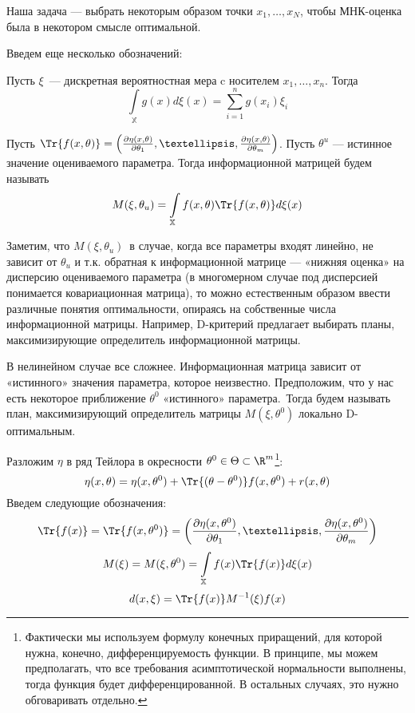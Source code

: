 Наша задача — выбрать некоторым образом точки $x_1, …, x_N$, чтобы МНК-оценка была в некотором смысле оптимальной. 

Введем еще несколько обозначений:
\begin{dfn}
Пусть $\xi$ — дискретная вероятностная мера c носителем $x_1,…, x_n$. Тогда
$$ \int\limits_{\mathbb{X}} g(x) d\xi(x) = \sum \limits_{i=1}^{n}  g(x_i)\xi_i$$
\end{dfn}

\begin{dfn}
Пусть $\Tr{f(x,\theta)} = \left(\frac{\partial\eta(x,\theta)}{\partial \theta_1}, …, \frac{\partial\eta(x,\theta)}{\partial \theta_m}\right)$. 
Пусть $\theta^u$ — истинное значение оцениваемого параметра. Тогда информационной матрицей будем называть
$$M(\xi, \theta_u) = \int\limits_{\mathbb{X}} f(x, \theta)\Tr{f(x, \theta)}d\xi(x)$$
\end{dfn}


Заметим, что $M(\xi, \theta_u)$ в случае, когда все параметры входят линейно, не зависит от $\theta_u$ и  т.к. обратная к информационной матрице — «нижняя оценка» на дисперсию оцениваемого параметра (в многомерном случае под дисперсией  понимается ковариационная матрица), то можно естественным образом ввести различные понятия оптимальности, опираясь на собственные числа информационной матрицы. Например, D-критерий предлагает выбирать планы, максимизирующие определитель информационной матрицы. 

В нелинейном случае все сложнее. Информационная матрица зависит от «истинного» значения параметра, которое неизвестно. Предположим, что у нас есть некоторое приближение $\theta^0$ «истинного» параметра. Тогда будем называть план, максимизирующий определитель матрицы $M(\xi, \theta^0)$ локально D-оптимальным. 

Разложим $\eta$ в ряд Тейлора в окресности $\theta^0 \in \Theta \subset \R^m$\footnote{Фактически мы используем формулу конечных приращений, для которой нужна, конечно, дифференцируемость функции.
В принципе, мы можем предполагать, что все требования асимптотической нормальности выполнены, тогда функция будет дифференцированной. В остальных случаях, это нужно обговаривать отдельно.}:
$$\eta(x, \theta) = \eta(x, \theta^0) + \Tr{(\theta-\theta^0)}f(x, \theta^0) + r(x,\theta)$$
Введем следующие обозначения:
$$ \Tr{f(x)} = \Tr{f(x, \theta^0)} = \left(\frac{\partial \eta(x, \theta^0)}{\partial\theta_1}, …, \frac{\partial \eta(x, \theta^0)}{\partial \theta_m}\right)$$
$$ M(\xi) = M(\xi, \theta^0) = \int\limits_{\mathbb{X}} f(x) \Tr{f(x)}d\xi(x)$$
$$d(x, \xi) = \Tr{f(x)} M^{-1}(\xi)f(x)$$


